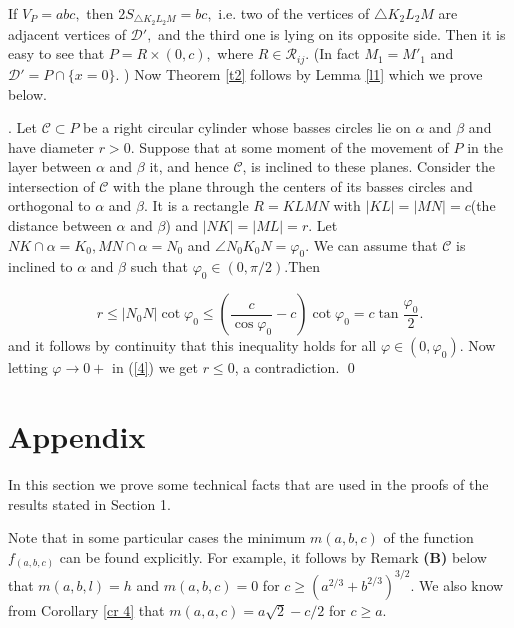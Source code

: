 \documentclass[12pt]{amsart}
\def\C{\mathcal C}
\def\D{\mathcal D}
\def\R{\mathcal R}
\def\s{\smallskip}
\def\n{\noindent}
\def\t{\triangle}
\def\ss{\subset}
\begin{document}
If $V_{P}=abc,$ then $2S_{\t K_2L_2M}=bc,$ i.e. two of the
vertices of $\t K_2L_2M$ are adjacent vertices of $\D',$ and the
third one is lying on its opposite side. Then it is easy to see
that $P=R\times(0,c),$ where $R\in\R_{ij}.$ (In fact $M_1=M'_1$
and $\D'=P\cap \{x=0\} .$ ) Now Theorem \ref{t2} follows by Lemma
\ref{l1}  which we prove below.

\s

\n{\it Proof of Lemma \ref{l1}}. Let $\C\ss P$ be a right
circular cylinder whose basses circles lie on $\alpha$ and $\beta$
and have diameter $r>0$. Suppose that at some moment of the
movement of $P$ in the layer between $\alpha$ and $\beta$ it, and
hence $\C$, is inclined  to these planes. Consider the
intersection of  $\C$ with the plane through the centers of its
basses circles and orthogonal to $\alpha$ and $\beta$. It is a
rectangle $R=KLMN$ with $|KL|=|MN|=c$(the distance between
$\alpha$ and $\beta$) and $|NK|=|ML|=r$. Let $NK\cap \alpha=K_0,
MN\cap \alpha=N_0$ and $\angle N_0K_0N=\varphi_0$. We can assume
that $\C$ is inclined to $\alpha$ and $\beta$ such that
$\varphi_0\in (0 , \pi/2)$.Then

\begin{equation}\label{4}
r\le |N_0N|\cot\varphi_0 \le\left(\frac
{c}{\cos\varphi_0}-c\right)\cot\varphi_0=c\tan\frac{\varphi_0}{2} .
\end{equation}
and it follows by continuity that this inequality holds for all
$\varphi \in (0 , \varphi_0)$. Now letting $\varphi\rightarrow 0+$
in (\ref{4}) we get $r\le 0$, a contradiction. \qed

\section{Appendix}

In this section we prove  some technical facts that are used in
the proofs of the results stated in Section 1.

\s

\n{\bf A.} Note that in some particular cases the minimum
$m(a,b,c)$ of the function $f_{(a,b,c)}$ can be found explicitly.
For example, it follows by Remark \textbf{(B)} below that
$m(a,b,l)=h$ and $m(a,b,c)=0$ for $c\ge (a^{2/3}+b^{2/3})^{3/2}
.$  We also know from Corollary \ref{cr 4} that
$m(a,a,c)=a\sqrt{2}-c/2$ for $c\ge a$.
\end{document}
